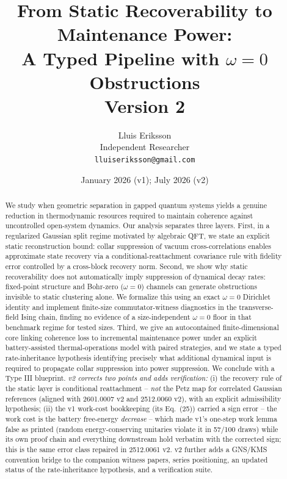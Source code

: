 \documentclass[11pt]{article}
\title{From Static Recoverability to Maintenance Power:\\
A Typed Pipeline with $\omega = 0$ Obstructions\\
{\normalsize Version 2}}
\author{Lluis Eriksson\\ Independent Researcher\\ \texttt{lluiseriksson@gmail.com}}
\date{January 2026 (v1); July 2026 (v2)}
\theoremstyle{remark}
\begin{document}
\maketitle

\begin{abstract}
We study when geometric separation in gapped quantum systems yields a
genuine reduction in thermodynamic resources required to maintain coherence
against uncontrolled open-system dynamics. Our analysis separates three
layers. First, in a regularized Gaussian split regime motivated by
algebraic QFT, we state an explicit static reconstruction bound: collar
suppression of vacuum cross-correlations enables approximate state recovery
via a conditional-reattachment covariance rule with fidelity error
controlled by a cross-block recovery norm. Second, we show why static
recoverability does not automatically imply suppression of dynamical decay
rates: fixed-point structure and Bohr-zero ($\omega = 0$) channels can
generate obstructions invisible to static clustering alone. We formalize
this using an exact $\omega = 0$ Dirichlet identity and implement
finite-size commutator-witness diagnostics in the transverse-field Ising
chain, finding no evidence of a size-independent $\omega = 0$ floor in that
benchmark regime for tested sizes. Third, we give an autocontained
finite-dimensional core linking coherence loss to incremental maintenance
power under an explicit battery-assisted thermal-operations model with
paired strategies, and we state a typed rate-inheritance hypothesis
identifying precisely what additional dynamical input is required to
propagate collar suppression into power suppression. We conclude with a
Type III blueprint. \emph{v2 corrects two points and adds verification:}
(i) the recovery rule of the static layer is conditional reattachment --
\emph{not} the Petz map for correlated Gaussian references (aligned with
2601.0007 v2 and 2512.0060 v2), with an explicit admissibility hypothesis;
(ii) the v1 work-cost bookkeeping (its Eq.~(25)) carried a sign error --
the work cost is the battery free-energy \emph{decrease} -- which made v1's
one-step work lemma false as printed (random energy-conserving unitaries
violate it in 57/100 draws) while its own proof chain and everything
downstream hold verbatim with the corrected sign; this is the same error
class repaired in 2512.0061 v2. v2 further adds a GNS/KMS convention
bridge to the companion witness papers, series positioning, an updated
status of the rate-inheritance hypothesis, and a verification suite.
\end{abstract}
\end{document}
